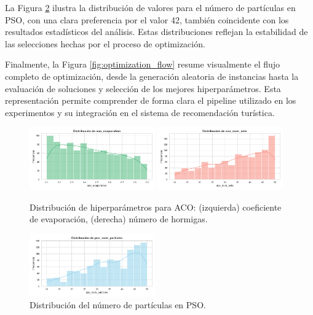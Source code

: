 \documentclass[runningheads]{llncs}
\begin{document}
La Figura \ref{fig:pso_num_particles_dist} ilustra la distribución de valores para el número de partículas en PSO, con una clara preferencia por el valor 42, también coincidente con los resultados estadísticos del análisis. Estas distribuciones reflejan la estabilidad de las selecciones hechas por el proceso de optimización.

Finalmente, la Figura \ref{fig:optimization_flow} resume visualmente el flujo completo de optimización, desde la generación aleatoria de instancias hasta la evaluación de soluciones y selección de los mejores hiperparámetros. Esta representación permite comprender de forma clara el pipeline utilizado en los experimentos y su integración en el sistema de recomendación turística.

\begin{figure}[H]
    \centering
    \includegraphics[width=0.48\textwidth]{aco_evaporation_dist.png}
    \hfill
    \includegraphics[width=0.48\textwidth]{aco_num_ants_dist.png}
    \caption{Distribución de hiperparámetros para ACO: (izquierda) coeficiente de evaporación, (derecha) número de hormigas.}
    \label{fig:aco_evaporation_dist}
    \label{fig:aco_num_ants_dist}
\end{figure}

\begin{figure}[H]
    \centering
    \includegraphics[width=0.48\textwidth]{pso_num_particles_dist.png}
    \caption{Distribución del número de partículas en PSO.}
    \label{fig:pso_num_particles_dist}
\end{figure}
\end{document}
